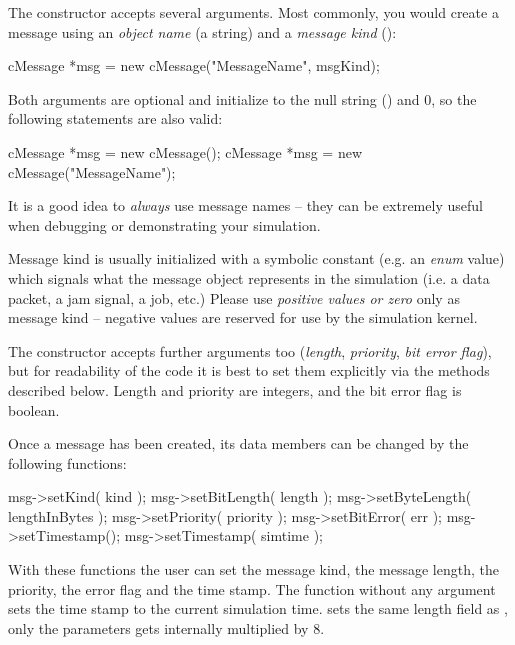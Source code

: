 The  constructor accepts several arguments.
Most commonly, you would create a message using an \textit{object name}
(a  string) and a \textit{message kind} ():

\begin{cpp}
cMessage *msg = new cMessage("MessageName", msgKind);
\end{cpp}

Both arguments are optional and initialize to the null string ()
and 0, so the following statements are also valid:

\begin{cpp}
cMessage *msg = new cMessage();
cMessage *msg = new cMessage("MessageName");
\end{cpp}

It is a good idea to \textit{always} use message names -- they can be
extremely useful when debugging or demonstrating your simulation.

Message kind is usually initialized with a symbolic constant
(e.g. an \textit{enum} value) which signals what the message object
represents in the simulation (i.e. a data packet, a jam signal, a job, etc.)
Please use \textit{positive values or zero} only as message kind --
negative values are reserved for use by the simulation kernel.


The  constructor accepts further arguments too
(\textit{length}, \textit{priority}, \textit{bit error flag}),
but for readability of the code it is best to set them explicitly
via the  methods described below.
Length and priority are integers, and the bit error flag is boolean.


Once a message has been created, its data members can be changed by the following functions:

\begin{cpp}
msg->setKind( kind );
msg->setBitLength( length );
msg->setByteLength( lengthInBytes );
msg->setPriority( priority );
msg->setBitError( err );
msg->setTimestamp();
msg->setTimestamp( simtime );
\end{cpp}

With these functions the user can set the message
kind, the message length,
the priority, the error
flag and the time stamp. The  function without any argument
sets the time stamp to the current simulation time.
 sets the same length field as ,
only the parameters gets internally multiplied by 8.

